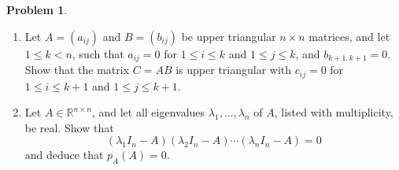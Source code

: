 \documentclass[12pt]{article}
\newcommand{\R}{\mathbb R}
\theoremstyle{definition}
\newtheorem{problem}{Problem}
\begin{document}
\begin{problem}\label{r7-pr-cayley-hamilton}
\begin{enumerate}
\item Let \(A=(a_{ij})\) and \(B=(b_{ij})\) be upper triangular \(n\times n\) matrices, and let \(1\leqslant k<n\), such that
\(a_{ij}=0\) for \(1\leqslant i\leqslant k\) and \(1\leqslant j\leqslant k\), and \(b_{k+1,k+1}=0\). Show that the matrix
\(C=AB\) is upper triangular with \(c_{ij}=0\) for \(1\leqslant i\leqslant k+1\) and \(1\leqslant j\leqslant k+1\).
\item Let \(A\in\R^{n\times n}\), and let all eigenvalues \(\lambda_1,\dots,\lambda_n\) of \(A\), listed with multiplicity,
be real. Show that
\[
(\lambda_1I_n-A)(\lambda_2I_n-A)\cdots(\lambda_nI_n-A)=0
\]
and deduce that \(p_A(A)=0\).
\end{enumerate}
\end{problem}
\end{document}
